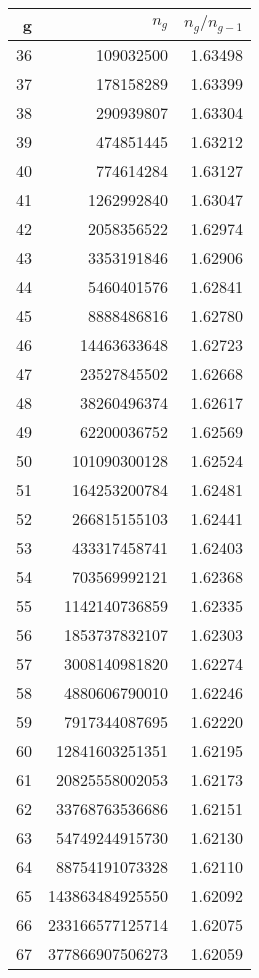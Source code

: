 \documentclass[reqno,11pt]{amsart}
\theoremstyle{plain}
\theoremstyle{definition}
\begin{document}
\begin{minipage}{0.5\textwidth}
\begin{tabular}{|r|r|r|}
\hline
g & $n_g$ & $n_g/n_{g-1}$\\
\hline
36 & 109032500 & 1.63498 \\
37 & 178158289 & 1.63399 \\
38 & 290939807 & 1.63304 \\
39 & 474851445 & 1.63212 \\
40 & 774614284 & 1.63127 \\
41 & 1262992840 & 1.63047 \\
42 & 2058356522 & 1.62974 \\
43 & 3353191846 & 1.62906 \\
44 & 5460401576 & 1.62841 \\
45 & 8888486816 & 1.62780 \\
46 & 14463633648 & 1.62723 \\
47 & 23527845502 & 1.62668 \\
48 & 38260496374 & 1.62617 \\
49 & 62200036752 & 1.62569 \\
50 & 101090300128 & 1.62524 \\
51 & 164253200784 & 1.62481 \\
52 & 266815155103 & 1.62441 \\
53 & 433317458741 & 1.62403 \\
54 & 703569992121 & 1.62368 \\
55 & 1142140736859 & 1.62335 \\
56 & 1853737832107 & 1.62303 \\
57 & 3008140981820 & 1.62274 \\
58 & 4880606790010 & 1.62246 \\
59 & 7917344087695 & 1.62220 \\
60 & 12841603251351 & 1.62195 \\
61 & 20825558002053 & 1.62173 \\
62 & 33768763536686 & 1.62151 \\
63 & 54749244915730 & 1.62130 \\
64 & 88754191073328 & 1.62110 \\
65 & 143863484925550 & 1.62092 \\
66 & 233166577125714 & 1.62075 \\
67 & 377866907506273 & 1.62059 \\\hline
\end{tabular}
\end{minipage}
\vspace{2em}
\end{document}
